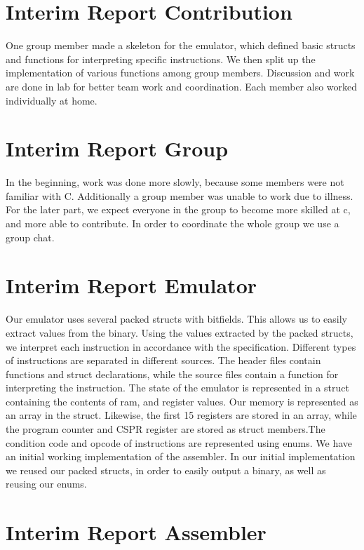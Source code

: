 \documentclass{article}
\begin{document}
\section{Interim Report Contribution}

One group member made a skeleton for the emulator, which defined basic structs and functions for interpreting specific instructions. We then split up the implementation of various functions among group members. Discussion and work are done in lab for better team work and coordination. Each member also worked individually at home.

\section{Interim Report Group}

In the beginning, work was done more slowly, because some members were not familiar with C. Additionally a group member was unable to work due to illness. For the later part, we expect everyone in the group to become more skilled at c, and more able to contribute. In order to coordinate the whole group we use a group chat. 

\section{Interim Report Emulator}

Our emulator uses several packed structs with bitfields. This allows us to easily extract values from the binary. Using the values extracted by the packed structs, we interpret each instruction in accordance with the specification. Different types of instructions are separated in different sources. The header files contain functions and struct declarations, while the source files contain a function for interpreting the instruction. The state of the emulator is represented in a struct containing the contents of ram, and register values. Our memory is represented as an array in the struct. Likewise, the first 15 registers are stored in an array, while the program counter and CSPR register are stored as struct members.The condition code and opcode of instructions are represented using enums.  We have an initial working implementation of the assembler. In our initial implementation we reused our packed structs, in order to easily output a binary, as well as reusing our enums. 

\section{Interim Report Assembler}
\end{document}
